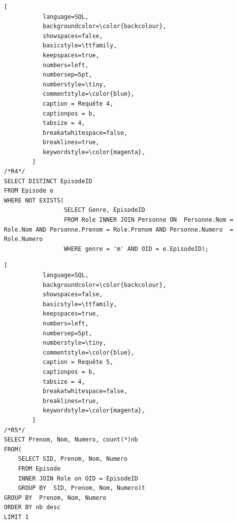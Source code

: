 \documentclass[10pt,a4paper]{article}
\begin{document}
\begin{lstlisting}[
           language=SQL,
           backgroundcolor=\color{backcolour},
           showspaces=false,
           basicstyle=\ttfamily,
           keepspaces=true,                 
           numbers=left,                    
           numbersep=5pt,
           numberstyle=\tiny,
           commentstyle=\color{blue},
           caption = Requête 4,
           captionpos = b,
           tabsize = 4,
           breakatwhitespace=false,         
    	   breaklines=true,
           keywordstyle=\color{magenta},
        ]
/*R4*/
SELECT DISTINCT EpisodeID
FROM Episode e
WHERE NOT EXISTS(
				 SELECT Genre, EpisodeID
                 FROM Role INNER JOIN Personne ON  Personne.Nom = Role.Nom AND Personne.Prenom = Role.Prenom AND Personne.Numero  = Role.Numero
                 WHERE genre = 'm' AND OID = e.EpisodeID);    
\end{lstlisting}
\begin{lstlisting}[
           language=SQL,
           backgroundcolor=\color{backcolour},
           showspaces=false,
           basicstyle=\ttfamily,
           keepspaces=true,                 
           numbers=left,                    
           numbersep=5pt,
           numberstyle=\tiny,
           commentstyle=\color{blue},
           caption = Requête 5,
           captionpos = b,
           tabsize = 4,
           breakatwhitespace=false,         
    	   breaklines=true,
           keywordstyle=\color{magenta},
        ]
/*R5*/
SELECT Prenom, Nom, Numero, count(*)nb
FROM(
	SELECT SID, Prenom, Nom, Numero
	FROM Episode
	INNER JOIN Role on OID = EpisodeID
	GROUP BY  SID, Prenom, Nom, Numero)t
GROUP BY  Prenom, Nom, Numero
ORDER BY nb desc
LIMIT 1
   
\end{lstlisting}
\newpage
\end{document}
